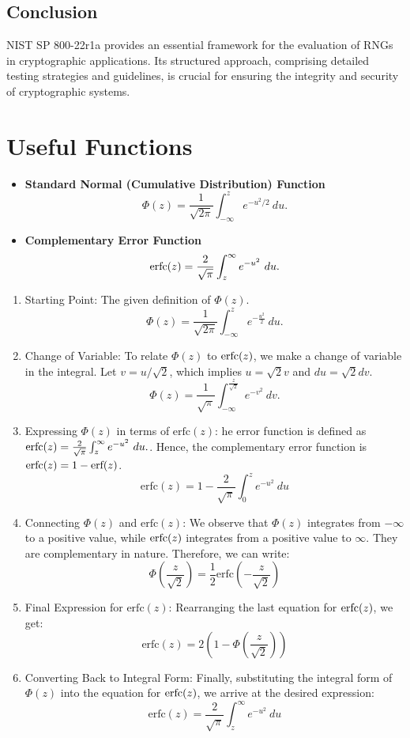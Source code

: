 \documentclass[12pt,openany]{book}
\theoremstyle{definition}
\begin{document}
	\subsection{Conclusion}
	NIST SP 800-22r1a provides an essential framework for the evaluation of RNGs in cryptographic applications. Its structured approach, comprising detailed testing strategies and guidelines, is crucial for ensuring the integrity and security of cryptographic systems.
	
	\section{Useful Functions}
	
	\begin{itemize}
		\item \textbf{Standard Normal (Cumulative Distribution) Function}
		\[
		\Phi(z)=\frac{1}{\sqrt{2\pi}}\int_{-\infty}^ze^{-u^2/2}\ du.
		\]
		\item \textbf{Complementary Error Function}
		\[
		\textnormal{erfc}(z)=\frac{2}{\sqrt{\pi}}\int_{z}^{\infty}e^{-u^2}\ du.
		\]
	\end{itemize}

	\begin{enumerate}[(1)]
		\item Starting Point: The given definition of $\Phi(z)$.
		\[
		\Phi(z) = \frac{1}{\sqrt{2\pi}}\int_{-\infty}^{z} e^{-\frac{u^2}{2}}\ du.
		\]
		\item Change of Variable:  To relate 
		$\Phi(z)$ to 
		$\textnormal{erfc}
		(z)$, we make a change of variable in the integral. Let 
		$v=u/\sqrt{2}$, which implies 
		$u=\sqrt{2}v$ and 
		$du=\sqrt{2}dv$. \[
			\Phi(z) = \frac{1}{\sqrt{\pi}}\int_{-\infty}^{\frac{z}{\sqrt{2}}} e^{-v^2}\ dv.
			\]
		\item Expressing \(\Phi(z)\) in terms of \(\text{erfc}(z)\): he error function is defined as $\textnormal{erfc}(z)=\frac{2}{\sqrt{\pi}}\int_{z}^{\infty}e^{-u^2}\ du.$. Hence, the complementary error function is 
		$\textnormal{erfc}(z)=1-\textnormal{erf}(z)$.
		\[
			\text{erfc}(z) = 1 - \frac{2}{\sqrt{\pi}}\int_{0}^{z} e^{-u^2}\ du
		\]
		\item Connecting \(\Phi(z)\) and \(\text{erfc}(z)\): We observe that 
		$\Phi(z)$ integrates from 
		$-\infty$ to a positive value, while 
		$\textnormal{erfc}(z)$ integrates from a positive value to 
		$\infty$. They are complementary in nature. Therefore, we can write:
		\[
			\Phi\left(\frac{z}{\sqrt{2}}\right) = \frac{1}{2} \text{erfc}\left(-\frac{z}{\sqrt{2}}\right)
		\]
		\item Final Expression for \(\text{erfc}(z)\): Rearranging the last equation for 
		$\textnormal{erfc}(z)$, we get:
		\[
			\text{erfc}(z) = 2 \left( 1 - \Phi\left(\frac{z}{\sqrt{2}}\right) \right)
		\]
		\item Converting Back to Integral Form:
		Finally, substituting the integral form of 
		$\Phi(z)$ into the equation for 
		$\textnormal{erfc}(z)$, we arrive at the desired expression:
		\[
			\text{erfc}(z) = \frac{2}{\sqrt{\pi}}\int_{z}^{\infty}e^{-u^2}\ du
		\]
	\end{enumerate}
	
\end{document}
